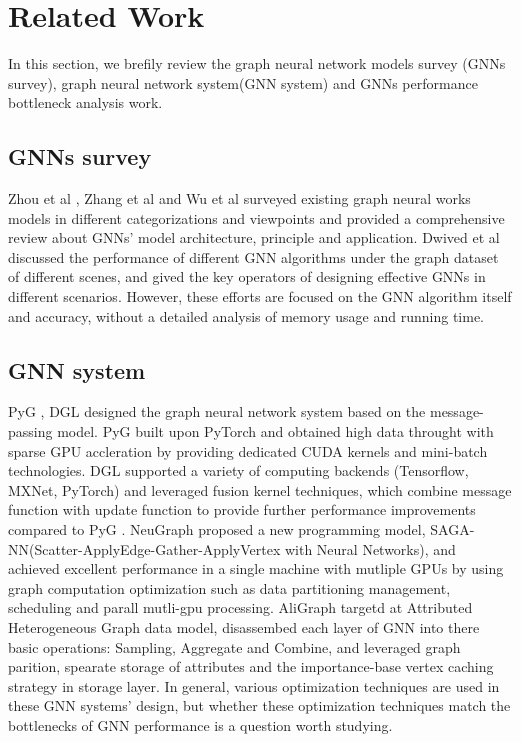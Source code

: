 \section{Related Work}

In this section, we brefily review the graph neural network models survey (GNNs survey), 
graph neural network system(GNN system) and GNNs performance bottleneck analysis work.

\subsection{GNNs survey}
Zhou et al \cite{zhou2018_gnn_review}, Zhang et al \cite{zhang2018_gnn_survey} and Wu et al \cite{comprehensive-survey-wu-2020} 
surveyed existing graph neural works models in different categorizations and viewpoints and provided a comprehensive review about GNNs' model 
architecture, principle and application. Dwived et al \cite{dwivedi2020_benchmark_of_gnn} discussed the performance of different GNN algorithms 
under the graph dataset of different scenes, and gived the key operators of designing effective GNNs in different scenarios. 
However, these efforts are focused on the GNN algorithm itself and accuracy, without a detailed analysis of memory usage and running time.

\subsection{GNN system}
PyG \cite{PyG}, DGL \cite{DGL} designed the graph neural network system based on the message-passing model. 
PyG \cite{PyG} built upon PyTorch and obtained high data throught with sparse GPU accleration by providing dedicated CUDA kernels 
and mini-batch technologies. DGL \cite{DGL} supported a variety of computing backends (Tensorflow, MXNet, PyTorch) and leveraged
fusion kernel techniques, which combine message function with update function to provide further performance improvements compared to PyG \cite{PyG}. 
NeuGraph \cite{ma2019_neugraph} proposed a new programming model, SAGA-NN(Scatter-ApplyEdge-Gather-ApplyVertex with Neural Networks), and achieved excellent
performance in a single machine with mutliple GPUs by using graph computation optimization such as data partitioning management, scheduling and parall mutli-gpu processing.
AliGraph \cite{zhu2019_aligraph} targetd at Attributed Heterogeneous Graph data model, disassembed each layer of GNN into there basic operations: Sampling, Aggregate and Combine,
and leveraged graph parition, spearate storage of attributes and the importance-base vertex caching strategy in storage layer. 
In general, various optimization techniques are used in these GNN systems' design, but whether these optimization techniques match the bottlenecks of GNN performance is a question
worth studying.

